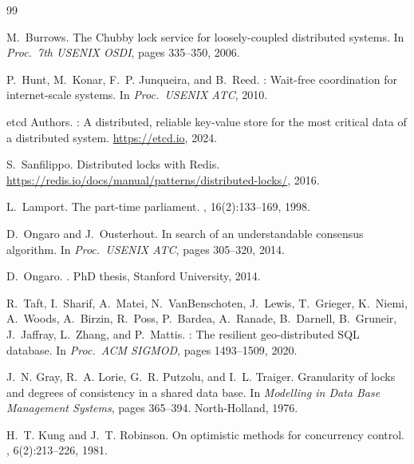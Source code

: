 \documentclass[sigconf]{acmart}
\begin{document}


\begin{thebibliography}{99}

M.~Burrows.
\newblock The {Chubby} lock service for loosely-coupled distributed systems.
\newblock In {\em Proc.\ 7th USENIX OSDI}, pages 335--350, 2006.

P.~Hunt, M.~Konar, F.~P. Junqueira, and B.~Reed.
: Wait-free coordination for internet-scale systems.
\newblock In {\em Proc.\ USENIX ATC}, 2010.

{etcd Authors}.
: A distributed, reliable key-value store for the most
  critical data of a distributed system.
\newblock \url{https://etcd.io}, 2024.

S.~Sanfilippo.
\newblock Distributed locks with {Redis}.
\newblock \url{https://redis.io/docs/manual/patterns/distributed-locks/}, 2016.

L.~Lamport.
\newblock The part-time parliament.
, 16(2):133--169, 1998.

D.~Ongaro and J.~Ousterhout.
\newblock In search of an understandable consensus algorithm.
\newblock In {\em Proc.\ USENIX ATC}, pages 305--320, 2014.

D.~Ongaro.
.
\newblock PhD thesis, Stanford University, 2014.

R.~Taft, I.~Sharif, A.~Matei, N.~VanBenschoten, J.~Lewis, T.~Grieger,
  K.~Niemi, A.~Woods, A.~Birzin, R.~Poss, P.~Bardea, A.~Ranade,
  B.~Darnell, B.~Gruneir, J.~Jaffray, L.~Zhang, and P.~Mattis.
: The resilient geo-distributed {SQL} database.
\newblock In {\em Proc.\ ACM SIGMOD}, pages 1493--1509, 2020.

J.~N. Gray, R.~A. Lorie, G.~R. Putzolu, and I.~L. Traiger.
\newblock Granularity of locks and degrees of consistency in a shared data
  base.
\newblock In {\em Modelling in Data Base Management Systems}, pages 365--394.
  North-Holland, 1976.

H.~T. Kung and J.~T. Robinson.
\newblock On optimistic methods for concurrency control.
, 6(2):213--226, 1981.


\end{thebibliography}
\end{document}
